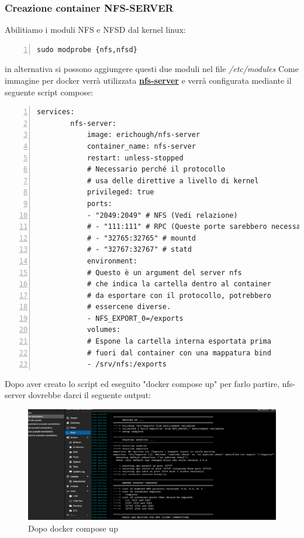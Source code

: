\documentclass[a4paper]{article}
\begin{document}
\subsubsection{Creazione container NFS-SERVER}
Abilitiamo i moduli NFS e NFSD dal kernel linux:
\begin{Verbatim}[numbers=left,breaklines]
    sudo modprobe {nfs,nfsd}
\end{Verbatim}
in alternativa si possono aggiungere questi due moduli nel file \textit{/etc/modules}
Come immagine per docker verrà utilizzata \href{https://hub.docker.com/r/erichough/nfs-server/}{\textbf{nfs-server}}
e verrà configurata mediante il seguente script compose:
\begin{Verbatim}[numbers=left,breaklines]
    services:
        nfs-server:
            image: erichough/nfs-server
            container_name: nfs-server
            restart: unless-stopped
            # Necessario perché il protocollo
            # usa delle direttive a livello di kernel
            privileged: true
            ports:
            - "2049:2049" # NFS (Vedi relazione)
            # - "111:111" # RPC (Queste porte sarebbero necessarie per supportare V3, non ci interessa per questo progetto)
            # - "32765:32765" # mountd
            # - "32767:32767" # statd
            environment:
            # Questo è un argument del server nfs
            # che indica la cartella dentro al container
            # da esportare con il protocollo, potrebbero
            # essercene diverse.
            - NFS_EXPORT_0=/exports
            volumes:
            # Espone la cartella interna esportata prima
            # fuori dal container con una mappatura bind
            - /srv/nfs:/exports
\end{Verbatim}
Dopo aver creato lo script ed eseguito "docker compose up" per farlo partire, nfs-server dovrebbe darci il seguente output:
\begin{figure}[H]
    \centering
    \includegraphics[scale=0.30]{images/NFSSettato.png}
    \caption{Dopo docker compose up}
\end{figure}
\printglossaries
\printbibliography
\end{document}
